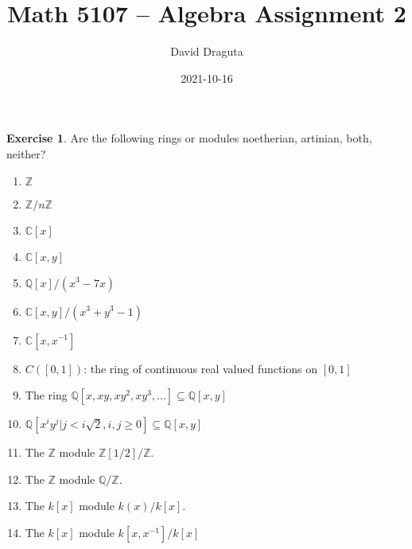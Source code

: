 \documentclass[12pt]{extarticle}
\title{ Math 5107 -- Algebra Assignment 2}
\author{David Draguta}
\date{2021-10-16}
\newcommand{\C}{\mathbb{C}}
\newcommand{\Q}{\mathbb{Q}}
\newcommand{\Z}{\mathbb{Z}}
\newcommand{\<}{\langle}
\renewcommand{\>}{\rangle}
\theoremstyle{definition}
\newtheorem{exercise}{Exercise}
\begin{document}
\maketitle

\begin{exercise}
  Are the following rings or modules noetherian, artinian, both, neither?
  \begin{enumerate}
  \item
    $\Z$
  \item
    $\Z/n\Z$
  \item
    $\C[x]$
  \item
    $\C[x,y]$
  \item
    $\Q[x]/(x^3-7x)$
  \item
    $\C[x,y]/(x^3+y^3-1)$
  \item
    $\C[x,x^{-1}]$
  \item
    $C([0,1])$: the ring of continuous real valued functions on $[0,1]$
  \item
    The ring $\Q[x,xy,xy^2,xy^3,\dots] \subseteq \Q[x,y]$
  \item
    $\Q[x^iy^j|j<i\sqrt{2}, i,j \geq 0] \subseteq \Q[x,y]$
  \item
    The $\Z$ module $\Z[1/2]/\Z$.
  \item
    The $\Z$ module $\Q/\Z$.
  \item
    The $k[x]$ module $k(x)/k[x]$.
  \item
    The $k[x]$ module $k[x,x^{-1}]/k[x]$ 
  \end{enumerate}
\end{exercise}
\end{document}
